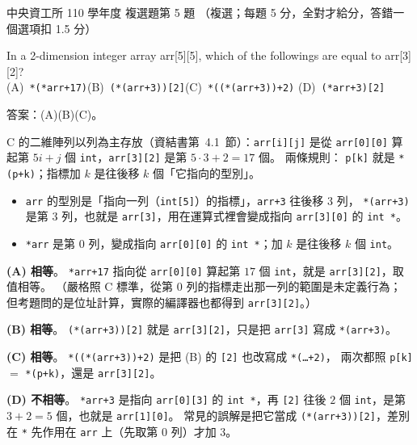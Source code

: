 \begin{pastexam}[label={px:ncu-110-dsa-05}]{中央資工所 110 學年度 複選題第 5 題}
（複選；每題 5 分，全對才給分，答錯一個選項扣 1.5 分）

In a 2-dimension integer array arr[5][5], which of the followings are equal to arr[3][2]?\\
(A)~\texttt{*(*arr+17)}\quad (B)~\texttt{(*(arr+3))[2]}\quad (C)~\texttt{*((*(arr+3))+2)}\quad
(D)~\texttt{(*arr+3)[2]}
\end{pastexam}

\begin{pastsoln}
答案：(A)(B)(C)。

C 的二維陣列以列為主存放（資結書第~4.1~節）：\texttt{arr[i][j]} 是從 \texttt{arr[0][0]} 算起第
$5i + j$ 個 \texttt{int}，\texttt{arr[3][2]} 是第 $5 \cdot 3 + 2 = 17$ 個。 兩條規則：
\texttt{p[k]} 就是 \texttt{*(p+k)}；指標加 $k$ 是往後移 $k$ 個「它指向的型別」。
\begin{itemize}
\item \texttt{arr} 的型別是「指向一列（\texttt{int[5]}）的指標」，\texttt{arr+3} 往後移 $3$ 列，
\texttt{*(arr+3)} 是第 $3$ 列，也就是 \texttt{arr[3]}，用在運算式裡會變成指向 \texttt{arr[3][0]} 的
\texttt{int *}。
\item \texttt{*arr} 是第 $0$ 列，變成指向 \texttt{arr[0][0]} 的 \texttt{int *}；加 $k$ 是往後移 $k$ 個
\texttt{int}。
\end{itemize}

\textbf{(A) 相等}。 \texttt{*arr+17} 指向從 \texttt{arr[0][0]} 算起第 $17$ 個 \texttt{int}，就是
\texttt{arr[3][2]}，取值相等。 （嚴格照 C 標準，從第 $0$ 列的指標走出那一列的範圍是未定義行為；
但考題問的是位址計算，實際的編譯器也都得到 \texttt{arr[3][2]}。）

\textbf{(B) 相等}。 \texttt{(*(arr+3))[2]} 就是 \texttt{arr[3][2]}，只是把 \texttt{arr[3]} 寫成
\texttt{*(arr+3)}。

\textbf{(C) 相等}。 \texttt{*((*(arr+3))+2)} 是把 (B) 的 \texttt{[2]} 也改寫成 \texttt{*(\ldots+2)}，
兩次都照 \texttt{p[k]} $=$ \texttt{*(p+k)}，還是 \texttt{arr[3][2]}。

\textbf{(D) 不相等}。 \texttt{*arr+3} 是指向 \texttt{arr[0][3]} 的 \texttt{int *}，再 \texttt{[2]} 往後
$2$ 個 \texttt{int}，是第 $3 + 2 = 5$ 個，也就是 \texttt{arr[1][0]}。 常見的誤解是把它當成
\texttt{(*(arr+3))[2]}，差別在 \texttt{*} 先作用在 \texttt{arr} 上（先取第 $0$ 列）才加 $3$。
\end{pastsoln}

